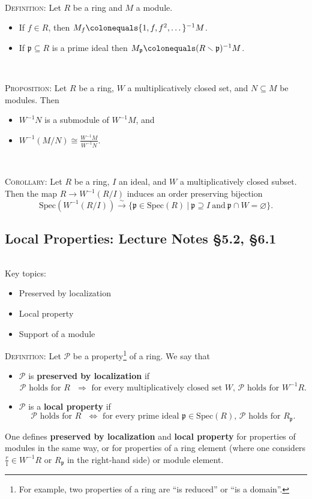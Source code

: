 \documentclass[12pt]{amsart}
\newcommand{\p}{\mathfrak{p}}
\newcommand{\Spec}{\mathrm{Spec}}
\newcommand{\0}{$\phantom{.}$}
\newcommand{\1}{\mathbbm{1}}
\newcommand{\ds}{\displaystyle}
\newcommand\ceq{\colonequals}
\begin{document}
\

\noindent \textsc{Definition:} Let $R$ be a ring and $M$ a module.
\begin{itemize}
\item If $f\in R$, then $M_f \ceq \{1,f,f^2,\dots\}^{-1} M$.
\item If $\p \subseteq R$ is a prime ideal then $M_{\p} \ceq (R\smallsetminus \p)^{-1} M$.
\end{itemize}

\

\noindent \textsc{Proposition:} Let $R$ be a ring, $W$ a multiplicatively closed set, and $N\subseteq M$ be modules. Then 
\begin{itemize}
\item $W^{-1}N$ is a submodule of $W^{-1}M$, and 
\item $\ds W^{-1}(M/N) \cong \frac{W^{-1}M}{W^{-1}N}$.
\end{itemize}

\

\noindent \textsc{Corollary:} Let $R$ be a ring, $I$ an ideal, and $W$ a multiplicatively closed subset. Then the map ${R\to W^{-1}(R/I)}$ induces an order preserving bijection
\[ \Spec(W^{-1}(R/I)) \stackrel{\sim}{\longrightarrow} \{ \p\in \Spec(R) \ | \ \p \supseteq I \ \text{and} \ \p \cap W=\varnothing\}.\]

\newpage

 \subsection{Local Properties: Lecture Notes \S5.2, \S6.1}\0
 
 
 \begin{framed} Key topics:
\begin{itemize}
\item Preserved by localization
\item Local property
\item Support of a module
\end{itemize}
\end{framed}
 
 \noindent \textsc{Definition:} Let $\mathcal{P}$ be a property\footnote{For example, two properties of a ring are ``is reduced'' or ``is a domain''.} of a ring. We say that 
\begin{itemize}
\item $\mathcal{P}$ is \textbf{preserved by localization} if 
\[ \text{$\mathcal{P}$ holds for $R$ $\Longrightarrow$ for every multiplicatively closed set $W$, $\mathcal{P}$ holds for $W^{-1}R$}.\]
\item $\mathcal{P}$ is a \textbf{local property} if 
\[ \text{$\mathcal{P}$ holds for $R$ $\Longleftrightarrow$ for every prime ideal $\p\in \Spec(R)$, $\mathcal{P}$ holds for $R_\p$}.\]
\end{itemize}
One defines \textbf{preserved by localization} and \textbf{local property} for properties of modules in the same way, or for properties of a ring element (where one considers $\frac{r}{1}\in W^{-1}R$ or $R_{\p}$ in the right-hand side) or module element. 
\end{document}
